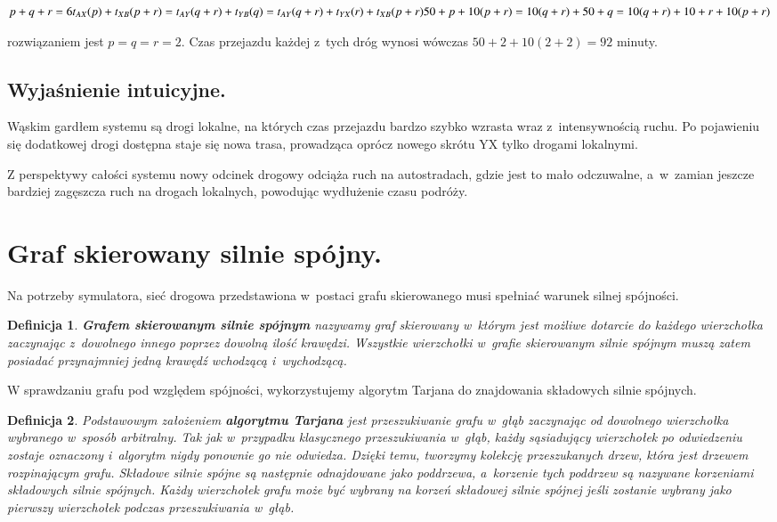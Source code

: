 \documentclass[twoside,12pt]{report}
\newtheorem{definition}{Definicja} %
\begin{document}
\begin{center}
\begin{math}
p+q+r = 6 \newline
t_{AX}(p)+t_{XB}(p+r) = t_{AY}(q+r) + t_{YB}(q) = t_{AY}(q+r)+t_{YX}(r)+t_{XB}(p+r)\newline
50+p+10(p+r) = 10(q+r)+50+q = 10(q+r)+ 10 + r + 10(p+r)\newline
\end{math}
\end{center}
rozwiązaniem jest $p=q=r=2$.
Czas przejazdu każdej z~tych dróg wynosi wówczas $50+2+10(2+2)=92$ minuty.

\subsection{Wyjaśnienie intuicyjne.}
Wąskim gardłem systemu są drogi lokalne, na których czas przejazdu bardzo szybko wzrasta wraz z~intensywnością ruchu. Po pojawieniu się dodatkowej drogi dostępna staje się nowa trasa, prowadząca oprócz nowego skrótu YX tylko drogami lokalnymi.

Z perspektywy całości systemu nowy odcinek drogowy odciąża ruch na autostradach, gdzie jest to mało odczuwalne, a~w~zamian jeszcze bardziej zagęszcza ruch na drogach lokalnych, powodując wydłużenie czasu podróży.

\section{Graf skierowany silnie spójny.}
Na potrzeby symulatora, sieć drogowa przedstawiona w~postaci grafu skierowanego musi spełniać warunek silnej spójności. 
\newline
\begin{definition}\label{Graf silnie spójny}
\textbf{Grafem skierowanym silnie spójnym} nazywamy graf skierowany w~którym jest możliwe dotarcie do każdego wierzchołka zaczynając z~dowolnego innego poprzez dowolną ilość krawędzi. Wszystkie wierzchołki w~grafie skierowanym silnie spójnym muszą zatem posiadać przynajmniej jedną krawędź wchodzącą i~wychodzącą\cite{silniespojny}.
\end{definition}

W sprawdzaniu grafu pod względem spójności, wykorzystujemy algorytm Tarjana do znajdowania składowych silnie spójnych.
\newline
\begin{definition}\label{Algorytm Tarjana}
Podstawowym założeniem \textbf{algorytmu Tarjana} jest przeszukiwanie grafu w~głąb zaczynając od dowolnego wierzchołka wybranego w~sposób arbitralny. Tak jak w~przypadku klasycznego przeszukiwania w~głąb, każdy sąsiadujący wierzchołek po odwiedzeniu zostaje oznaczony i~algorytm nigdy ponownie go nie odwiedza. Dzięki temu, tworzymy kolekcję przeszukanych drzew, która jest drzewem rozpinającym grafu. Składowe silnie spójne są następnie odnajdowane jako poddrzewa, a~korzenie tych poddrzew są nazywane korzeniami składowych silnie spójnych. Każdy wierzchołek grafu może być wybrany na korzeń składowej silnie spójnej jeśli zostanie wybrany jako pierwszy wierzchołek podczas przeszukiwania w~głąb.
\end{definition}
\end{document}
